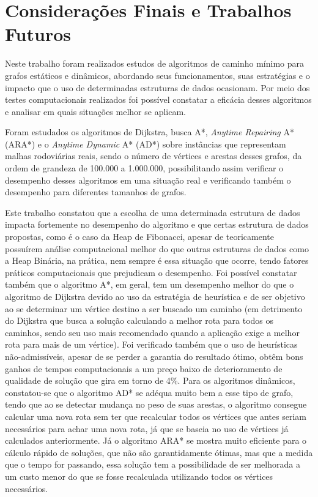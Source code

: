 \chapter{Considerações Finais e Trabalhos Futuros}
\label{sec-conclusao}

Neste trabalho foram realizados estudos de algoritmos de caminho mínimo para grafos estáticos e dinâmicos, abordando seus funcionamentos, suas estratégias e o impacto que o uso de determinadas estruturas de dados ocasionam. Por meio dos testes computacionais realizados foi possível constatar a eficácia desses algoritmos e analisar em quais situações melhor se aplicam.

Foram estudados os algoritmos de Dijkstra, busca A*, \textit{Anytime Repairing} A* (ARA*) e o \textit{Anytime Dynamic} A* (AD*) sobre instâncias que representam malhas rodoviárias reais, sendo o número de vértices e arestas desses grafos, da ordem de grandeza de 100.000 a 1.000.000, possibilitando assim verificar o desempenho desses algoritmos em uma situação real e verificando também o desempenho para diferentes tamanhos de grafos.

Este trabalho constatou que a escolha de uma determinada estrutura de dados impacta fortemente no desempenho do algoritmo e que certas estrutura de dados propostas, como é o caso da Heap de Fibonacci, apesar de teoricamente possuírem análise computacional melhor do que outras estruturas de dados como a Heap Binária, na prática, nem sempre é essa situação que ocorre, tendo fatores práticos computacionais que prejudicam o desempenho. Foi possível constatar também que o algoritmo A*, em geral, tem um desempenho melhor do que o algoritmo de Dijkstra devido ao uso da estratégia de heurística e de ser objetivo ao se determinar um vértice destino a ser buscado um caminho (em detrimento do Dijkstra que busca a solução calculando a melhor rota para todos os caminhos, sendo seu uso mais recomendado quando a aplicação exige a melhor rota para mais de um vértice). Foi verificado também que o uso de heurísticas não-admissíveis, apesar de se perder a garantia do resultado ótimo, obtêm bons ganhos de tempos computacionais a um preço baixo de deterioramento de qualidade de solução que gira em torno de 4\%. Para os algoritmos dinâmicos, constatou-se que o algoritmo AD* se adéqua muito bem a esse tipo de grafo, tendo que ao se detectar mudança no peso de suas arestas, o algoritmo consegue calcular uma nova rota sem ter que recalcular todos os vértices que antes seriam necessários para achar uma nova rota, já que se baseia no uso de vértices já calculados anteriormente. Já o algoritmo ARA* se mostra muito eficiente para o cálculo rápido de soluções, que não são garantidamente ótimas, mas que a medida que o tempo for passando, essa solução tem a possibilidade de ser melhorada a um custo menor do que se fosse recalculada utilizando todos os vértices necessários.

